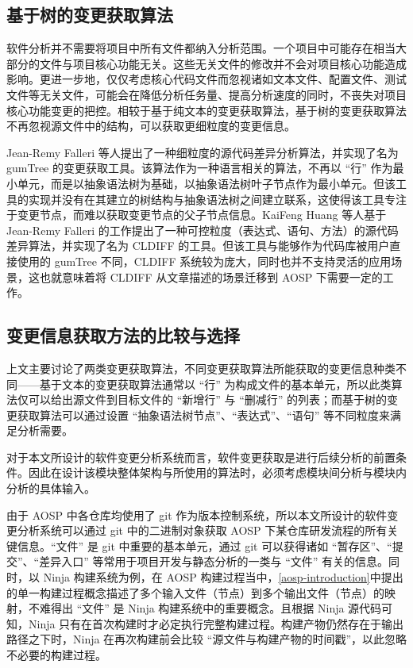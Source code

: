 \subsection{基于树的变更获取算法}

软件分析并不需要将项目中所有文件都纳入分析范围。一个项目中可能存在相当大部分的文件与项目核心功能无关。这些无关文件的修改并不会对项目核心功能造成影响。更进一步地，仅仅考虑核心代码文件而忽视诸如文本文件、配置文件、测试文件等无关文件，可能会在降低分析任务量、提高分析速度的同时，不丧失对项目核心功能变更的把控。相较于基于纯文本的变更获取算法，基于树的变更获取算法不再忽视源文件中的结构，可以获取更细粒度的变更信息。

Jean-Remy Falleri 等人提出了一种细粒度的源代码差异分析算法，并实现了名为 gumTree 的变更获取工具\cite{DBLP:conf/kbse/FalleriMBMM14}。该算法作为一种语言相关的算法，不再以 “行” 作为最小单元，而是以抽象语法树为基础，以抽象语法树叶子节点作为最小单元。但该工具的实现并没有在其建立的树结构与抽象语法树之间建立联系，这使得该工具专注于变更节点，而难以获取变更节点的父子节点信息。KaiFeng Huang 等人基于 Jean-Remy Falleri 的工作提出了一种可控粒度（表达式、语句、方法）的源代码差异算法，并实现了名为 CLDIFF 的工具\cite{10.1145/3238147.3238219}。但该工具与能够作为代码库被用户直接使用的 gumTree 不同，CLDIFF 系统较为庞大，同时也并不支持灵活的应用场景，这也就意味着将 CLDIFF 从文章描述的场景迁移到 AOSP 下需要一定的工作。

\subsection{变更信息获取方法的比较与选择}

上文主要讨论了两类变更获取算法，不同变更获取算法所能获取的变更信息种类不同——基于文本的变更获取算法通常以 “行” 为构成文件的基本单元，所以此类算法仅可以给出源文件到目标文件的 “新增行” 与 “删减行” 的列表；而基于树的变更获取算法可以通过设置 “抽象语法树节点”、“表达式”、“语句” 等不同粒度来满足分析需要。

对于本文所设计的软件变更分析系统而言，软件变更获取是进行后续分析的前置条件。因此在设计该模块整体架构与所使用的算法时，必须考虑模块间分析与模块内分析的具体输入。

由于 AOSP 中各仓库均使用了 git 作为版本控制系统，所以本文所设计的软件变更分析系统可以通过 git 中的二进制对象获取 AOSP 下某仓库研发流程的所有关键信息。“文件” 是 git 中重要的基本单元，通过 git 可以获得诸如 “暂存区”、“提交”、“差异入口” 等常用于项目开发与静态分析的一类与 “文件” 有关的信息。同时，以 Ninja 构建系统为例，在 AOSP 构建过程当中，\ref{aosp-introduction}中提出的单一构建过程概念描述了多个输入文件（节点）到多个输出文件（节点）的映射，不难得出 “文件” 是 Ninja 构建系统中的重要概念。且根据 Ninja 源代码可知，Ninja 只有在首次构建时才必定执行完整构建过程。构建产物仍然存在于输出路径之下时，Ninja 在再次构建前会比较 “源文件与构建产物的时间戳”，以此忽略不必要的构建过程。

